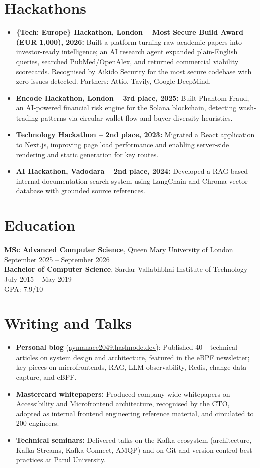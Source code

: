 \documentclass[a4paper,10pt]{article}
\begin{document}
\section{Hackathons}
\begin{itemize}
  \item \textbf{\{Tech: Europe\} Hackathon, London -- Most Secure Build Award (EUR 1,000), 2026:} Built a platform turning raw academic papers into investor-ready intelligence; an AI research agent expanded plain-English queries, searched PubMed/OpenAlex, and returned commercial viability scorecards. Recognised by Aikido Security for the most secure codebase with zero issues detected. Partners: Attio, Tavily, Google DeepMind.
  \item \textbf{Encode Hackathon, London -- 3rd place, 2025:} Built Phantom Fraud, an AI-powered financial risk engine for the Solana blockchain, detecting wash-trading patterns via circular wallet flow and buyer-diversity heuristics.
  \item \textbf{Technology Hackathon -- 2nd place, 2023:} Migrated a React application to Next.js, improving page load performance and enabling server-side rendering and static generation for key routes.
  \item \textbf{AI Hackathon, Vadodara -- 2nd place, 2024:} Developed a RAG-based internal documentation search system using LangChain and Chroma vector database with grounded source references.
\end{itemize}

\section{Education}
\textbf{MSc Advanced Computer Science}, Queen Mary University of London \hfill {\small September 2025 -- September 2026}\\
\textbf{Bachelor of Computer Science}, Sardar Vallabhbhai Institute of Technology \hfill {\small July 2015 -- May 2019}\\
{\small GPA: 7.9/10}

\section{Writing and Talks}
\begin{itemize}
  \item \textbf{Personal blog} \small{(\href{https://aymanace2049.hashnode.dev}{aymanace2049.hashnode.dev})}: Published 40+ technical articles on system design and architecture, featured in the eBPF newsletter; key pieces on microfrontends, RAG, LLM observability, Redis, change data capture, and eBPF.
  \item \textbf{Mastercard whitepapers:} Produced company-wide whitepapers on Accessibility and Microfrontend architecture, recognised by the CTO, adopted as internal frontend engineering reference material, and circulated to 200 engineers.
  \item \textbf{Technical seminars:} Delivered talks on the Kafka ecosystem (architecture, Kafka Streams, Kafka Connect, AMQP) and on Git and version control best practices at Parul University.
\end{itemize}
\end{document}
